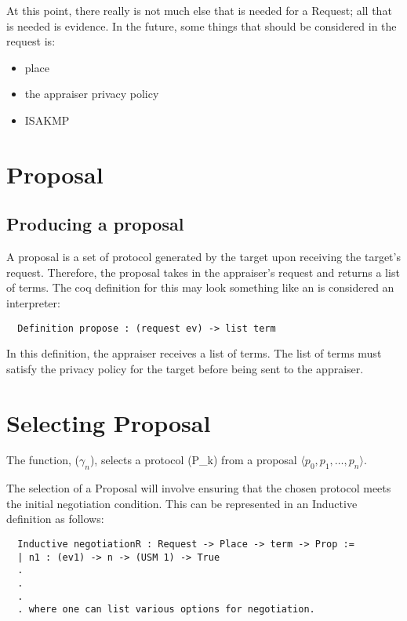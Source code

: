 \documentclass[10pt]{article}
\newcommand{\squash}{\itemsep=0pt\parskip=0pt}
\begin{document}
  At this point, there really is not much else that is needed for a Request; all that is needed is evidence. In the future, some things that should be considered in the request is:
  
  \begin{itemize}
   \squash
   \item place
   \item the appraiser privacy policy
   \item ISAKMP
  \end{itemize}

\section {Proposal}

\subsection {Producing a proposal}

  A proposal is a set of protocol generated by the target upon receiving the target's request. Therefore, the proposal takes in the appraiser's request and returns a list of terms. The coq definition for this may look something like an is considered an interpreter: 
  
  \begin{verbatim}
  Definition propose : (request ev) -> list term
  \end{verbatim}  
  
  In this definition, the appraiser receives a list of terms. The list of terms must satisfy the privacy policy for the target before being sent to the appraiser. 

\section {Selecting Proposal}

  The function, ($\gamma_{n}$), selects a protocol (P_{k}) 
  from a proposal $\langle p_0,p_1,\ldots,p_n\rangle$.  

  The selection of a Proposal will involve ensuring that the chosen protocol meets the initial negotiation condition. This can be represented in an Inductive definition as follows:
  
  \begin{verbatim}
  Inductive negotiationR : Request -> Place -> term -> Prop :=
  | n1 : (ev1) -> n -> (USM 1) -> True
  .
  .
  .
  . where one can list various options for negotiation. 
  \end{verbatim} 
  
\end{document}
